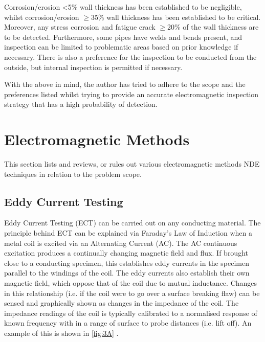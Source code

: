 \documentclass[a4paper,twoside,11pt]{article}
\begin{document}
Corrosion/erosion <5\% wall thickness has been established to be negligible, whilst corrosion/erosion $\geq$35\% wall thickness has been established to be critical. 
Moreover, any stress corrosion and fatigue crack $\geq$20\% of the wall thickness are to be detected. 
Furthermore, some pipes have welds and bends present, and inspection can be limited to problematic areas based on prior knowledge if necessary. There is also a preference for the inspection to be conducted from the outside, but internal inspection is permitted if necessary. 

With the above in mind, the author has tried to adhere to the scope and the preferences listed whilst trying to provide an accurate electromagnetic inspection strategy that has a high probability of detection. 

\newpage

\section{Electromagnetic Methods}
This section lists and reviews, or rules out various electromagnetic methods NDE techniques in relation to the problem scope.

\subsection{Eddy Current Testing}
Eddy Current Testing (ECT) can be carried out on any conducting material.
The principle behind ECT can be explained via Faraday's Law of Induction when a metal coil is excited via an Alternating Current (AC). 
The AC continuous excitation produces a continually changing magnetic field and flux.
If brought close to a conducting specimen, this establishes eddy currents in the specimen parallel to the windings of the coil. 
The eddy currents also establish their own magnetic field, which oppose that of the coil due to  mutual inductance. 
Changes in this relationship (i.e. if the coil were to go over a surface breaking flaw) can be sensed and graphically shown as changes in the impedance of the coil. 
The impedance readings of the coil is typically calibrated to a normalised response of known frequency with in a range of surface to probe distances (i.e. lift off). An example of this is shown in \ref{fig:3A} \cite{nagyElectromagneticNDE2019}.
\end{document}
